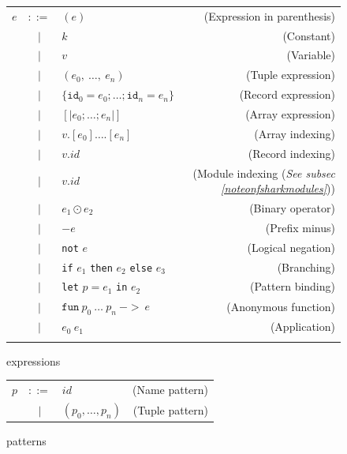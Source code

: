 \begin{figure}[h]
  \centering
  \begin{tabular}{lclr}
    $e$ & $::=$ & $(e)$ & (Expression in parenthesis) \\
        & $|$   & $k$ & (Constant) \\
        & $|$   & $v$ & (Variable) \\
        & $|$   & $(e_0,~\ldots,~e_n)$ & (Tuple expression) \\
        & $|$   & $\{\texttt{id}_0=e_0 ; \ldots ; \texttt{id}_n=e_n\}$ & (Record expression) \\
        & $|$   & $[\vert e_0 ; \ldots ; e_n\vert]$ & (Array expression) \\
        & $|$   & $v.[e_0] \ldots .[e_n]$ & (Array indexing) \\
        & $|$   & $v.id$ & (Record indexing) \\
        & $|$   & $v.id$ & (Module indexing (\textit{See subsec \ref{noteonfsharkmodules}})) \\
        & $|$   & $e_1 \odot e_2$ & (Binary operator) \\
        & $|$   & $-e$ & (Prefix minus) \\
        & $|$   & \texttt{not} $e$ & (Logical negation) \\
        & $|$   & \texttt{if} $e_1$ \texttt{then} $e_2$ \texttt{else} $e_3$ & (Branching) \\
        & $|$   & \texttt{let} $p = e_1$ \texttt{in} $e_2$ & (Pattern binding) \\
        & $|$   & $\mathtt{fun}~p_0~\ldots~p_n~\mathtt{->}~e$ & (Anonymous function) \\
        & $|$   & $e_0~e_1$ & (Application) \\

    \\
  \end{tabular}
  \caption{\fshark{} expressions}
\label{fig:fsharkexpressions}
\end{figure}

\begin{figure}[h]
  \centering
  \begin{tabular}{@{}lclr}
    $p$ & $::=$ & $id$ & (Name pattern) \\
        & $|$   & $(p_0, \ldots, p_n)$ & (Tuple pattern) \\
  \end{tabular}
  \caption{\fshark{} patterns}
\label{fig:fsharkpatterns}
\end{figure}



